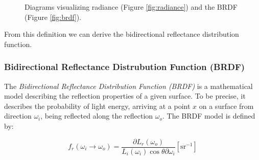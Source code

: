 \begin{figure}
	\centering
	\hfill
	\caption{Diagrams visualizing radiance (Figure \ref{fig:radiance}) and the BRDF (Figure \ref{fig:brdf}).}
\end{figure}

From this definition we can derive the bidirectional reflectance distribution function.

\subsubsection{Bidirectional Reflectance Distrubution Function (BRDF)}
The \emph{Bidirectional Reflectance Distribution Function (BRDF)} is a mathematical model describing the reflection properties of a given surface. To be precise, it describes the probability of light energy, arriving at a point $x$ on a surface from direction $\omega_{i}$, being reflected along the reflection $\omega_{o}$. 
The BRDF model is defined by:

\begin{equation} \label{eq:brdf}
f_{r}(\omega_{i} \rightarrow \omega_{o}) = \frac{\partial L_{r}(\omega_{o})}{L_{i}(\omega_{i})\cos\theta\partial\omega_{i}} [\mathrm{sr}^{-1}]
\end{equation}

